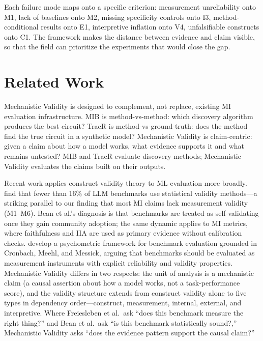 \documentclass{article}
\begin{document}
Each failure mode maps onto a specific criterion: measurement unreliability onto M1, lack of baselines onto M2, missing specificity controls onto I3, method-conditional results onto E1, interpretive inflation onto V4, unfalsifiable constructs onto C1. The framework makes the distance between evidence and claim visible, so that the field can prioritize the experiments that would close the gap.


\section{Related Work}
\label{sec:related}

Mechanistic Validity is designed to complement, not replace, existing MI evaluation infrastructure. MIB \citep{mueller2025mib} is method-vs-method: which discovery algorithm produces the best circuit? TracR \citep{lindner2024interp} is method-vs-ground-truth: does the method find the true circuit in a synthetic model? Mechanistic Validity is claim-centric: given a claim about how a model works, what evidence supports it and what remains untested? MIB and TracR evaluate discovery methods; Mechanistic Validity evaluates the claims built on their outputs.

Recent work applies construct validity theory to ML evaluation more broadly. \citet{bean2025measuring} find that fewer than 16\% of LLM benchmarks use statistical validity methods---a striking parallel to our finding that most MI claims lack measurement validity (M1--M6). Bean et al.'s diagnosis is that benchmarks are treated as self-validating once they gain community adoption; the same dynamic applies to MI metrics, where faithfulness and IIA are used as primary evidence without calibration checks. \citet{freiesleben2025benchmarking} develop a psychometric framework for benchmark evaluation grounded in Cronbach, Meehl, and Messick, arguing that benchmarks should be evaluated as measurement instruments with explicit reliability and validity properties. Mechanistic Validity differs in two respects: the unit of analysis is a mechanistic claim (a causal assertion about how a model works, not a task-performance score), and the validity structure extends from construct validity alone to five types in dependency order---construct, measurement, internal, external, and interpretive. Where Freiesleben et al.\ ask ``does this benchmark measure the right thing?'' and Bean et al.\ ask ``is this benchmark statistically sound?,'' Mechanistic Validity asks ``does the evidence pattern support the causal claim?''
\end{document}
